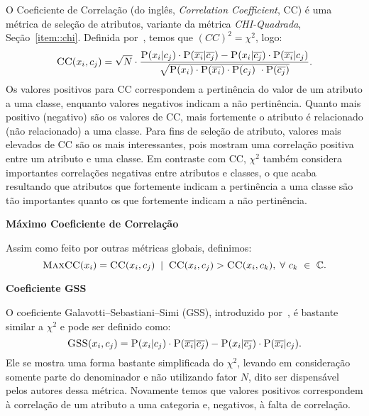 \begin{description}
O Coeficiente de Correlação (do inglês, \textit{Correlation Coefficient}, \textsc{CC}) é uma métrica de seleção de atributos, variante da métrica \textit{CHI-Quadrada}, Seção~\ref{item::chi}. Definida por~\cite{Ng97}, temos que $(CC)^2 = \chi^2$, logo:
\begin{equation}\label{eqn::ce}
   \textsc{CC}(x_i, c_j) = \sqrt{N} \cdot \frac{ \textsc{P}(x_i|c_j) \cdot \textsc{P}(\overline{x_i}|\overline{c_j}) - \textsc{P}(x_i|\overline{c_j}) \cdot \textsc{P}(\overline{x_i}|c_j) } {\sqrt{ \textsc{P}(x_i) \cdot \textsc{P}(\overline{x_i}) \cdot \textsc{P}(c_j) \ \cdot \textsc{P}(\overline{c_j}) } }.
\end{equation}
Os valores positivos para CC correspondem a pertinência do valor de um atributo a uma classe, enquanto valores negativos indicam a não pertinência. Quanto mais positivo (negativo) são os valores de CC, mais fortemente o atributo é relacionado (não relacionado) a uma classe. Para fins de seleção de atributo, valores mais elevados de CC são os mais interessantes, pois mostram uma correlação positiva entre um atributo e uma classe. Em contraste com CC, $\chi^2$ também considera importantes correlações negativas entre atributos e classes, o que acaba resultando que atributos que fortemente indicam a pertinência a uma classe são tão importantes quanto os que fortemente indicam a não pertinência.

\item{\textbf{Máximo Coeficiente de Correlação}}
\label{item::maxcc}

Assim como feito por outras métricas globais, definimos:
\begin{equation}\label{eqn::maxcc}
\textsc{MaxCC}(x_i) = \textsc{CC}(x_i,c_j) \; \; | \;\; \textsc{CC}(x_i, c_j) > \textsc{CC}(x_i, c_k), \; \forall\ c_k\ \in\ \mathbb{C}.
\end{equation}



\item{\textbf{Coeficiente GSS}}
\label{item::gss}

O coeficiente Galavotti–Sebastiani–Simi (GSS), introduzido por~\cite{Galavotti00}, é bastante similar a $\chi^2$ e pode ser definido como:
\begin{equation}\label{eqn::gss}
   \textsc{GSS}(x_i, c_j) = \textsc{P}(x_i|c_j) \cdot \textsc{P}(\overline{x_i}|\overline{c_j}) - \textsc{P}(x_i|\overline{c_j}) \cdot \textsc{P}(\overline{x_i}|c_j).
\end{equation}
Ele se mostra uma forma bastante simplificada do $\chi^2$, levando em consideração somente parte do denominador e não utilizando fator $N$, dito ser dispensável pelos autores dessa métrica. Novamente temos que valores positivos correspondem à correlação de um atributo a uma categoria e, negativos, à falta de correlação. 


\end{description}
